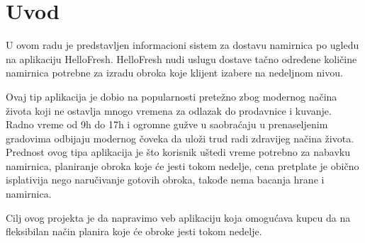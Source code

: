 \section{Uvod}

	U ovom radu je predstavljen informacioni sistem za dostavu namirnica po 
ugledu na aplikaciju HelloFresh. HelloFresh nudi uslugu dostave tačno određene količine namirnica potrebne za izradu obroka koje klijent izabere na nedeljnom nivou. 

	Ovaj tip aplikacija je dobio na popularnosti pretežno zbog modernog načina života koji ne ostavlja mnogo vremena za odlazak do prodavnice i kuvanje. Radno vreme od 9h do 17h i ogromne gužve u saobraćaju u prenaseljenim gradovima odbijaju modernog čoveka da uloži trud radi zdravijeg načina života. Prednost ovog tipa aplikacija je što korisnik uštedi vreme potrebno za nabavku namirnica, planiranje obroka koje će jesti tokom nedelje, cena pretplate je obično isplativija nego naručivanje gotovih obroka, takođe nema bacanja hrane i namirnica.
	
	Cilj ovog projekta je da napravimo veb aplikaciju koja omogućava kupcu da na fleksibilan način planira koje će obroke jesti tokom nedelje. 
